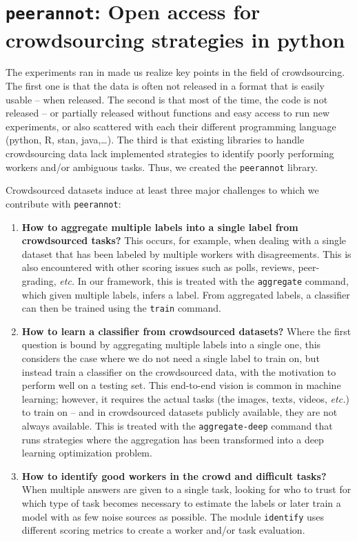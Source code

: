 \section{\texttt{peerannot}: Open access for crowdsourcing strategies in python}

The experiments ran in  made us realize key points in the field of crowdsourcing. The first one is that the data is often not released in a format that is easily usable -- when released. The second is that most of the time, the code is not released -- or partially released without functions and easy access to run new experiments, or also scattered with each their different programming language (python, R, stan, java,\dots). The third is that existing libraries to handle crowdsourcing data lack implemented strategies to identify poorly performing workers and/or ambiguous tasks.
Thus, we created the \texttt{peerannot} library.

Crowdsourced datasets induce at least three major challenges to which we contribute with \texttt{peerannot}:

\begin{enumerate}
  \item \textbf{How to aggregate multiple labels into a single label from crowdsourced tasks?} This occurs, for example, when dealing with a single dataset that has been labeled by multiple workers with disagreements. This is also encountered with other scoring issues such as polls, reviews, peer-grading, \textit{etc.} In our framework, this is treated with the \texttt{aggregate} command, which given multiple labels, infers a label. From aggregated labels, a classifier can then be trained using the \texttt{train} command.
  \item \textbf{How to learn a classifier from crowdsourced datasets?} Where the first question is bound by aggregating multiple labels into a single one, this considers the case where we do not need a single label to train on, but instead train a classifier on the crowdsourced data, with the motivation to perform well on a testing set. This end-to-end vision is common in machine learning; however, it requires the actual tasks (the images, texts, videos, \textit{etc.}) to train on -- and in crowdsourced datasets publicly available, they are not always available. This is treated with the \texttt{aggregate-deep} command that runs strategies where the aggregation has been transformed into a deep learning optimization problem.
  \item \textbf{How to identify good workers in the crowd and difficult tasks?} When multiple answers are given to a single task, looking for who to trust for which type of task becomes necessary to estimate the labels or later train a model with as few noise sources as possible. The module \texttt{identify} uses different scoring metrics to create a worker and/or task evaluation.
\end{enumerate}

